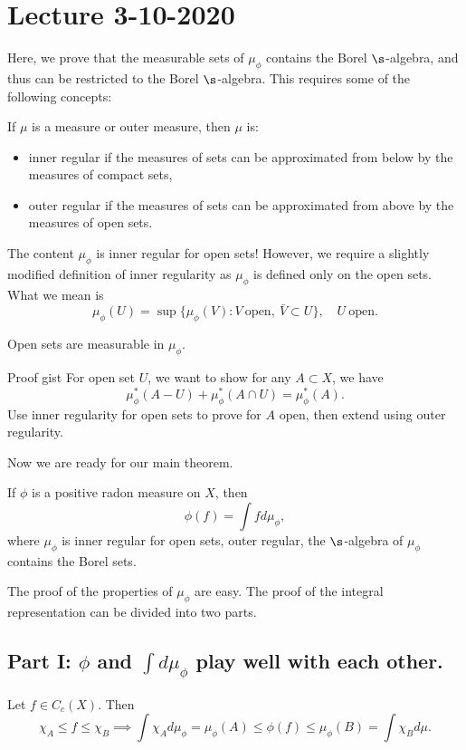 \section{Lecture 3-10-2020}
Here, we prove that the measurable sets of $\mu_\phi$ contains the Borel $\s$-algebra, and thus can be restricted to the Borel $\s$-algebra. This requires some of the following concepts:
\begin{dfn}
If $\mu$ is a measure or outer measure, then $\mu$ is:
\begin{itemize}
    \item inner regular if the measures of sets can be approximated from below by the measures of compact sets,
    \item outer regular if the measures of sets can be approximated from above by the measures of open sets.
\end{itemize}
\end{dfn}
The content $\mu_\phi$ is inner regular for open sets! However, we require a slightly modified definition of inner regularity as $\mu_\phi$ is defined only on the open sets. What we mean is
\[
    \mu_\phi(U) = \sup\{\mu_\phi(V): V \ \text{open}, \ \bar{V} \subset U\}, \quad U \ \text{open.}
\]

\begin{thm}
Open sets are measurable in $\mu_\phi$.
\end{thm}

\begin{details}{Proof gist}
For open set $U$, we want to show for any $A \subset X$, we have
\[
    \mu_\phi^*(A - U) + \mu_\phi^*(A \cap U) = \mu_\phi^*(A).
\]
Use inner regularity for open sets to prove for $A$ open, then extend using outer regularity.
\end{details}

Now we are ready for our main theorem.

\begin{thm}
If $\phi$ is a positive radon measure on $X$, then
\[
    \phi(f) = \int f d\mu_\phi,
\]
where $\mu_\phi$ is inner regular for open sets, outer regular, the $\s$-algebra of $\mu_\phi$ contains the Borel sets.
\end{thm}
The proof of the properties of $\mu_\phi$ are easy. The proof of the integral representation can be divided into two parts.

\subsection{Part I: $\phi$ and $\int d\mu_\phi$ play well with each other.} Let $f \in C_c(X)$. Then
\[
    \chi_A \leq f \leq \chi_B \implies \int \chi_A d\mu_\phi = \mu_\phi(A) \leq \phi(f) \leq \mu_\phi(B) = \int \chi_B d\mu.
\]

